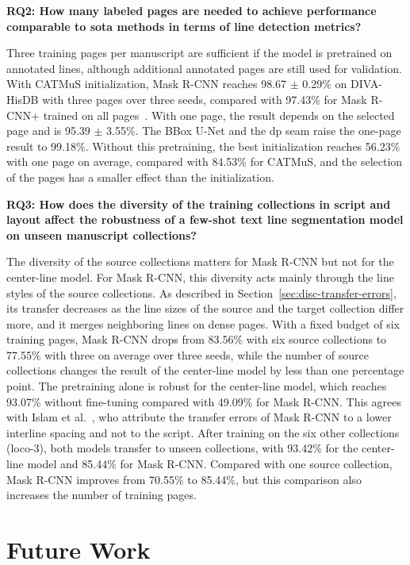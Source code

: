 \textbf{RQ2: How many labeled pages are needed to achieve performance comparable to \gls{sota} methods in terms of line detection metrics?}

Three training pages per manuscript are sufficient if the model is pretrained on annotated lines, although additional annotated pages are still used for validation. With CATMuS initialization, Mask R-CNN reaches 98.67 \(\pm\) 0.29\% on DIVA-HisDB with three pages over three seeds, compared with 97.43\% for Mask R-CNN+ trained on all pages~\cite{signals3030032}. With one page, the result depends on the selected page and is 95.39 \(\pm\) 3.55\%. The BBox U-Net and the \gls{dp} seam raise the one-page result to 99.18\%. Without this pretraining, the best initialization reaches 56.23\% with one page on average, compared with 84.53\% for CATMuS, and the selection of the pages has a smaller effect than the initialization.

\textbf{RQ3: How does the diversity of the training collections in script and layout affect the robustness of a few-shot text line segmentation model on unseen manuscript collections?}

The diversity of the source collections matters for Mask R-CNN but not for the center-line model. For Mask R-CNN, this diversity acts mainly through the line styles of the source collections. As described in Section~\ref{sec:disc-transfer-errors}, its transfer decreases as the line sizes of the source and the target collection differ more, and it merges neighboring lines on dense pages. With a fixed budget of six training pages, Mask R-CNN drops from 83.56\% with six source collections to 77.55\% with three on average over three seeds, while the number of source collections changes the result of the center-line model by less than one percentage point. The pretraining alone is robust for the center-line model, which reaches 93.07\% without fine-tuning compared with 49.09\% for Mask R-CNN. This agrees with Islam et al.~\cite{Textline_maskrcnn}, who attribute the transfer errors of Mask R-CNN to a lower interline spacing and not to the script. After training on the six other collections (\gls{loco}-3), both models transfer to unseen collections, with 93.42\% for the center-line model and 85.44\% for Mask R-CNN. Compared with one source collection, Mask R-CNN improves from 70.55\% to 85.44\%, but this comparison also increases the number of training pages.

\section{Future Work}
\label{sec:future-work}

